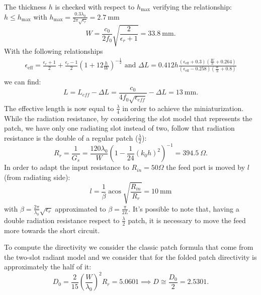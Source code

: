 \documentclass[11pt]{report}
\begin{document}
The thickness $h$ is checked with respect to $h_{\max}$ verifying the relationship: $h \leq h_{\max }$  with $h_{\max }=\frac{0.3 \lambda_{0}}{2 \pi \sqrt{\epsilon_{r}}}=2.7 \mathrm{~mm}$ 
\begin{equation}
W=\frac{c_{0}}{2 f_{0}} \sqrt{\frac{2}{\epsilon_{r}+1}}=33.8 \mathrm{~mm}.
\end{equation}
With the following relationships
$$
\begin{array}{l}
\epsilon_{\mathrm{eff}}=\frac{\epsilon_{r}+1}{2}+\frac{\epsilon_{r}-1}{2}\left(1+12 \frac{h}{W}\right)^{-\frac{1}{2}} \text { and } \Delta L=0.412 h \frac{\left(\epsilon_{\mathrm{eff}}+0.3\right)\left(\frac{W}{h}+0.264\right)}{\left(\epsilon_{\mathrm{eff}}-0.258\right)\left(\frac{W}{h}+0.8\right)} \\
\end{array}
$$
we can find:
\begin{equation}
L=L_{e f f}- \Delta L=\frac{c_{0}}{4 f_{0} \sqrt{\epsilon_{e f f}}}- \Delta L=13 \mathrm{~mm}.
\end{equation}
The effective length is now equal to $\frac{\lambda}{4}$ in order to achieve the miniaturization. While the radiation resistance, by considering the slot model that represents the patch, we have only one radiating slot instead of two, follow that radiation resistance is the double of a regular patch ($\frac{\lambda}{2}$):
\begin{equation}
R_{r}=\frac{1}{G_{s}}=\frac{120 \lambda_{0}}{W}\left(1-\frac{1}{24}\left(k_{0} h\right)^{2}\right)^{-1}=394.5 ~\Omega.
\end{equation}
In order to adapt the input resistance to $R_{i n}=50 \Omega$ the feed port is moved by $l$ (from radiating side):
\begin{equation}
l=\frac{1}{\beta} \operatorname{acos} \sqrt{\frac{R_{i n}}{R_{r}}}=10 \mathrm{~mm}
\end{equation}
with $\beta=\frac{2 \pi}{\lambda_{0}} \sqrt{\epsilon_{r}}$ approximated to $\beta=\frac{\pi}{2L}.$ It's possible to note that, having a double radiation resistance respect to $\frac{\lambda}{2}$ patch, it is necessary to move the feed more towards the short circuit.
\newline

To compute the directivity we consider the classic patch formula that come from the two-slot radiant model and we consider that for the folded patch directivity is approximately the half of it:
\begin{equation}
D_{0}=\frac{2}{15}\left(\frac{W}{\lambda_{0}}\right)^{2} R_{r}=5.0601\implies D\cong\frac{D_{0}}{2}=2.5301.
\end{equation}
\end{document}

